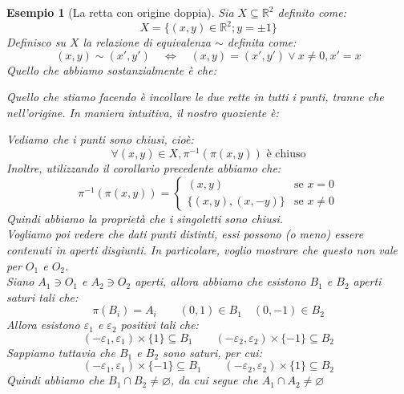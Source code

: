 \documentclass[11pt,a4paper,twoside]{article}
\newcommand{\vareps}{\varepsilon}
\newtheorem{es}{Esempio}
\theoremstyle{definition}
\begin{document}
\begin{es}[La retta con origine doppia]
	Sia $X\subseteq \mathbb R^2$ definito come:
	\[ X = \{(x,y) \in \mathbb R^2; y = \pm 1\} \]
	Definisco su $X$ la relazione di equivalenza $\sim$ definita come:
	\[ (x,y) \sim (x',y') \quad \Leftrightarrow \quad (x,y) = (x',y') \vee x\neq 0, x' = x \]
	Quello che abbiamo sostanzialmente è che:
	\begin{center}
	\end{center}
	Quello che stiamo facendo è incollare le due rette in tutti i punti, tranne che nell'origine.
	In maniera intuitiva, il nostro quoziente è:
	\begin{center}
	\end{center}
	Vediamo che i punti sono chiusi, cioè:
	\[\forall (x,y)\in X, \pi^{-1}(\pi(x,y)) \text{ è chiuso}\]
	Inoltre, utilizzando il corollario precedente abbiamo che:
	\[ \pi^{-1}(\pi(x,y)) = \begin{cases} (x,y) & \text{se }x=0\\ \{ (x,y),(x,-y) \} & \text{se }x \neq 0 \end{cases}\]
	Quindi abbiamo la proprietà che i singoletti sono chiusi.\\
	Vogliamo poi vedere che dati punti distinti, essi possono (o meno) essere contenuti in aperti disgiunti.
	In particolare, voglio mostrare che questo non vale per $O_1$ e $O_2$.\\
	Siano $A_1 \ni O_1$ e $A_2 \ni O_2$ aperti, allora abbiamo che esistono $B_1$ e $B_2$ aperti saturi tali che:
	\[ \pi(B_i)=A_i \qquad (0,1)\in B_1\quad (0,-1)\in B_2\]
	Allora esistono $\vareps_1$ e $\vareps_2$ positivi tali che:
	\[ (-\vareps_1,\vareps_1) \times\{1\} \subseteq B_1\qquad (-\vareps_2,\vareps_2) \times\{-1\} \subseteq B_2 \]
	Sappiamo tuttavia che $B_1$ e $B_2$ sono saturi, per cui:
	\[ (-\vareps_1,\vareps_1) \times\{-1\} \subseteq B_1\qquad (-\vareps_2,\vareps_2) \times\{1\} \subseteq B_2 \]
	Quindi abbiamo che $B_1 \cap B_2 \neq \varnothing$, da cui segue che $A_1 \cap A_2 \neq \varnothing$
\end{es}
\end{document}
